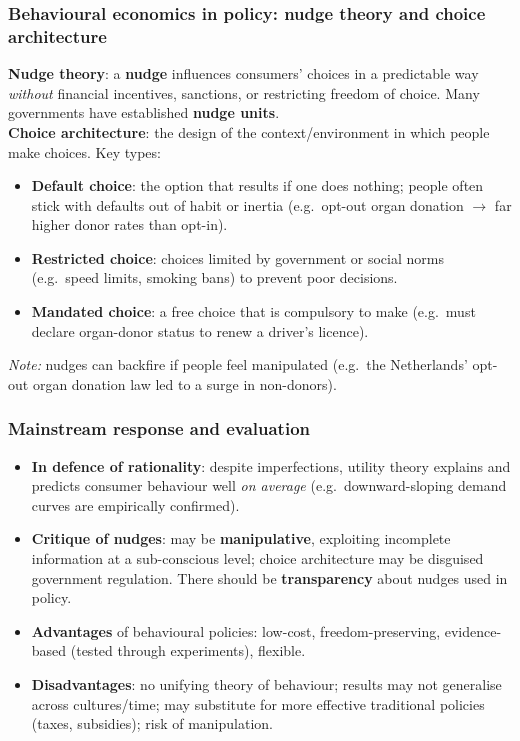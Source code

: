 \subsubsection*{Behavioural economics in policy: nudge theory and choice architecture}
\textbf{Nudge theory}: a \textbf{nudge} influences consumers' choices in a predictable way \textit{without} financial incentives, sanctions, or restricting freedom of choice. Many governments have established \textbf{nudge units}.
\\
\textbf{Choice architecture}: the design of the context/environment in which people make choices. Key types:
\begin{itemize}
  \item \textbf{Default choice}: the option that results if one does nothing; people often stick with defaults out of habit or inertia (e.g.\ opt-out organ donation $\to$ far higher donor rates than opt-in).
  \item \textbf{Restricted choice}: choices limited by government or social norms (e.g.\ speed limits, smoking bans) to prevent poor decisions.
  \item \textbf{Mandated choice}: a free choice that is compulsory to make (e.g.\ must declare organ-donor status to renew a driver's licence).
\end{itemize}
\textit{Note:} nudges can backfire if people feel manipulated (e.g.\ the Netherlands' opt-out organ donation law led to a surge in non-donors).
\subsubsection*{Mainstream response and evaluation}
\begin{itemize}
  \item \textbf{In defence of rationality}: despite imperfections, utility theory explains and predicts consumer behaviour well \textit{on average} (e.g.\ downward-sloping demand curves are empirically confirmed).
  \item \textbf{Critique of nudges}: may be \textbf{manipulative}, exploiting incomplete information at a sub-conscious level; choice architecture may be disguised government regulation. There should be \textbf{transparency} about nudges used in policy.
  \item \textbf{Advantages} of behavioural policies: low-cost, freedom-preserving, evidence-based (tested through experiments), flexible.
  \item \textbf{Disadvantages}: no unifying theory of behaviour; results may not generalise across cultures/time; may substitute for more effective traditional policies (taxes, subsidies); risk of manipulation.
\end{itemize}
